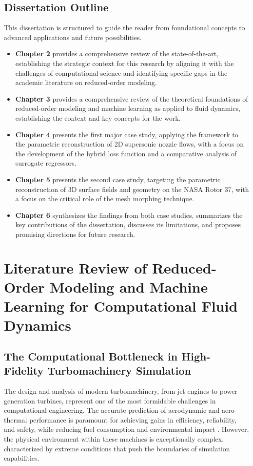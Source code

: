\documentclass[dsc, EN]{ufabcFHZh}
\begin{document}
\section{Dissertation Outline}

This dissertation is structured to guide the reader from foundational concepts to advanced applications and future possibilities.

\begin{itemize}
    \item \textbf{Chapter 2} provides a comprehensive review of the state-of-the-art, establishing the strategic context for this research by aligning it with the challenges of computational science and identifying specific gaps in the academic literature on reduced-order modeling.
    \item \textbf{Chapter 3} provides a comprehensive review of the theoretical foundations of reduced-order modeling and machine learning as applied to fluid dynamics, establishing the context and key concepts for the work.
    \item \textbf{Chapter 4} presents the first major case study, applying the framework to the parametric reconstruction of 2D supersonic nozzle flows, with a focus on the development of the hybrid loss function and a comparative analysis of surrogate regressors.
    \item \textbf{Chapter 5} presents the second case study, targeting the parametric reconstruction of 3D surface fields and geometry on the NASA Rotor 37, with a focus on the critical role of the mesh morphing technique.
    \item \textbf{Chapter 6} synthesizes the findings from both case studies, summarizes the key contributions of the dissertation, discusses its limitations, and proposes promising directions for future research.
\end{itemize}

\chapter{Literature Review of Reduced-Order Modeling and Machine Learning for Computational Fluid Dynamics}

\section{The Computational Bottleneck in High-Fidelity Turbomachinery Simulation}

The design and analysis of modern turbomachinery, from jet engines to power generation turbines, represent one of the most formidable challenges in computational engineering. The accurate prediction of aerodynamic and aero-thermal performance is paramount for achieving gains in efficiency, reliability, and safety, while reducing fuel consumption and environmental impact \citep{synthesized2024}. However, the physical environment within these machines is exceptionally complex, characterized by extreme conditions that push the boundaries of simulation capabilities.
\end{document}
